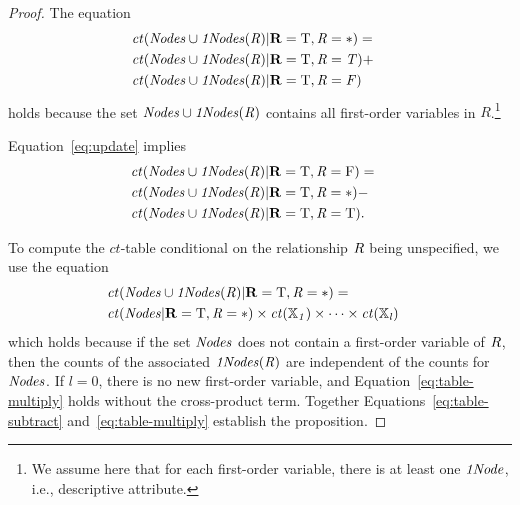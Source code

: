 \documentclass{vldb}
\newcommand{\ct}{\mathit{ct}}
\begin{document}
\begin{proof}
The equation 
\begin{align}
&\ct(\Nodes  \cup \eatts(R)|\set{R} = \true, R = *) = &\label{eq:update}  \\ 
&\ct(\Nodes  \cup \eatts(R)|\set{R} = \true, R = T)  + & \nonumber \\ 
&\ct(\Nodes  \cup \eatts(R)|\set{R} = \true, R = F) & \nonumber
\end{align}
holds because the set $\it{Nodes} \cup \it{1Nodes}(R)$ contains all first-order variables in $R$.\footnote{We assume here that  for each first-order variable, there is at least one $\it{1Node}$, i.e., descriptive attribute.} %

 Equation~\eqref{eq:update} implies
\begin{align} 
&\ct(\Nodes  \cup \eatts(R)|\set{R} = \true, R = \false) =& \label{eq:table-subtract} \\ 
&\ct(\Nodes  \cup \eatts(R)|\set{R} = \true, R = *) -&\nonumber  \\
 & \ct(\Nodes  \cup \eatts(R)|\set{R} = \true, R = \true).& \nonumber
\end{align}

To compute the $\ct$-table conditional on the relationship $R$ being unspecified, we use the equation
\begin{align}
&\ct(\Nodes  \cup \eatts(R)|\set{R} = \true, R = *) =  &\label{eq:table-multiply}\\
&\ct(\Nodes|\set{R} = \true, R =*) \times \ct(\X_{1}) \times \cdots \times \ct(\X_{l})& \nonumber
\end{align}
which holds because if the set $\it{Nodes}$ does not contain a first-order variable of $R$, then the counts of the associated $\it{1Nodes}(R)$ are independent of the counts for $\it{Nodes}$. 
If $l = 0$, there is no new first-order variable, and Equation~\eqref{eq:table-multiply} holds without  the cross-product term.
%
Together Equations~\eqref{eq:table-subtract} and~\eqref{eq:table-multiply} establish the proposition.
\end{proof}
\end{document}
